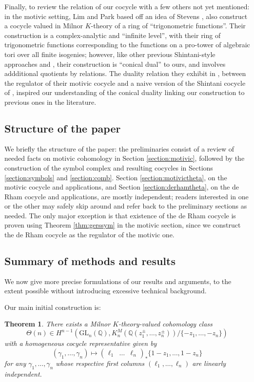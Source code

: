 \documentclass[10pt]{amsart}
\newtheorem{thm}{Theorem}[section]
\theoremstyle{definition}
\newcommand{\Q}{\mathbb{Q}}
\newcommand{\GL}{\mathrm{GL}}
\numberwithin{equation}{section}
\begin{document}
    Finally, to review the relation of our cocycle with a few others not yet mentioned: in the motivic setting, Lim and Park \cite{LP} based off an idea of Stevens \cite{Stevens2}, also construct a cocycle valued in Milnor $K$-theory of a ring of ``trigonometric functions''. Their construction is a complex-analytic and ``infinite level'', with their ring of trigonometric functions corresponding to the functions on a pro-tower of algebraic tori over all finite isogenies; however, like other previous Shintani-style approaches \cite{CDG} and \cite{Hill}, their construction is ``conical dual'' to ours, and involves addditional quotients by relations. The duality relation they exhibit in \cite[\S3]{LP}, between the regulator of their motivic cocycle and a naive version of the Shintani cocycle of \cite{Hill}, inspired our understanding of the conical duality linking our construction to previous ones in the literature. 

    \subsection{Structure of the paper}

        We briefly the structure of the paper: the preliminaries consist of a review of needed facts on motivic cohomology in Section \ref{section:motivic}, followed by the construction of the symbol complex and resulting cocycles in Sections \ref{section:symbols} and \ref{section:comb}. Section \ref{section:motivictheta}, on the motivic cocycle and applications, and Section \ref{section:derhamtheta}, on the de Rham cocycle and applications, are mostly independent; readers interested in one or the other may safely skip around and refer back to the preliminary sections as needed. The only major exception is that existence of the de Rham cocycle is proven using Theorem \ref{thm:gerssym} in the motivic section, since we construct the de Rham cocycle as the regulator of the motivic one.

    \subsection{Summary of methods and results}
    We now give more precise formulations of our results and arguments, to the extent possible without introducing excessive technical background. 
    
     Our main initial construction is:
    \begin{thm} \label{thm:thm1}
    There exists a Milnor $K$-theory-valued cohomology class
    \[
    \Theta(n) \in H^{n-1}(\GL_n(\Q), K_n^M(\Q(z_1^{\pm},\ldots, z_n^{\pm}))/\{-z_1,\ldots, -z_n\})
    \]
    with a homogeneous cocycle representative given by
    \[
        (\gamma_1,\ldots, \gamma_n) \mapsto \begin{pmatrix}\ell_1 & \ldots & \ell_n\end{pmatrix}_* \{1-z_1,\ldots, 1-z_n\}
    \]
    for any $\gamma_1,\ldots, \gamma_n$ whose respective first columns $(\ell_1,\ldots, \ell_n)$ are linearly independent.
    \end{thm}
\end{document}
